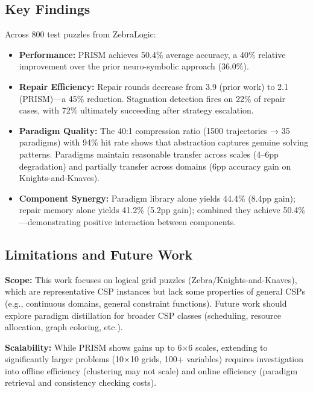 \subsection{Key Findings}

Across 800 test puzzles from ZebraLogic:

\begin{itemize}
    \item \textbf{Performance:} PRISM achieves 50.4\% average accuracy, a 40\% relative improvement over the prior neuro-symbolic approach (36.0\%).

    \item \textbf{Repair Efficiency:} Repair rounds decrease from 3.9 (prior work) to 2.1 (PRISM)—a 45\% reduction. Stagnation detection fires on 22\% of repair cases, with 72\% ultimately succeeding after strategy escalation.

    \item \textbf{Paradigm Quality:} The 40:1 compression ratio (1500 trajectories → 35 paradigms) with 94\% hit rate shows that abstraction captures genuine solving patterns. Paradigms maintain reasonable transfer across scales (4--6pp degradation) and partially transfer across domains (6pp accuracy gain on Knights-and-Knaves).

    \item \textbf{Component Synergy:} Paradigm library alone yields 44.4\% (8.4pp gain); repair memory alone yields 41.2\% (5.2pp gain); combined they achieve 50.4\%—demonstrating positive interaction between components.
\end{itemize}

\subsection{Limitations and Future Work}

\textbf{Scope:} This work focuses on logical grid puzzles (Zebra/Knights-and-Knaves), which are representative CSP instances but lack some properties of general CSPs (e.g., continuous domains, general constraint functions). Future work should explore paradigm distillation for broader CSP classes (scheduling, resource allocation, graph coloring, etc.).

\textbf{Scalability:} While PRISM shows gains up to 6×6 scales, extending to significantly larger problems (10×10 grids, 100+ variables) requires investigation into offline efficiency (clustering may not scale) and online efficiency (paradigm retrieval and consistency checking costs).

